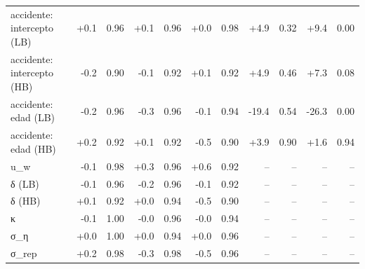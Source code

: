 \begin{tabular}{lrrrrrrrrrr}
accidente: intercepto (LB) & +0.1 & 0.96 & +0.1 & 0.96 & +0.0 & 0.98 & +4.9 & 0.32 & +9.4 & 0.00 \\
accidente: intercepto (HB) & -0.2 & 0.90 & -0.1 & 0.92 & +0.1 & 0.92 & +4.9 & 0.46 & +7.3 & 0.08 \\
accidente: edad (LB) & -0.2 & 0.96 & -0.3 & 0.96 & -0.1 & 0.94 & -19.4 & 0.54 & -26.3 & 0.00 \\
accidente: edad (HB) & +0.2 & 0.92 & +0.1 & 0.92 & -0.5 & 0.90 & +3.9 & 0.90 & +1.6 & 0.94 \\
u\_w & -0.1 & 0.98 & +0.3 & 0.96 & +0.6 & 0.92 & -- & -- & -- & -- \\
δ (LB) & -0.1 & 0.96 & -0.2 & 0.96 & -0.1 & 0.92 & -- & -- & -- & -- \\
δ (HB) & +0.1 & 0.92 & +0.0 & 0.94 & -0.5 & 0.90 & -- & -- & -- & -- \\
κ & -0.1 & 1.00 & -0.0 & 0.96 & -0.0 & 0.94 & -- & -- & -- & -- \\
σ\_η & +0.0 & 1.00 & +0.0 & 0.94 & +0.0 & 0.96 & -- & -- & -- & -- \\
σ\_rep & +0.2 & 0.98 & -0.3 & 0.98 & -0.5 & 0.96 & -- & -- & -- & -- \\
\hline
\end{tabular}
